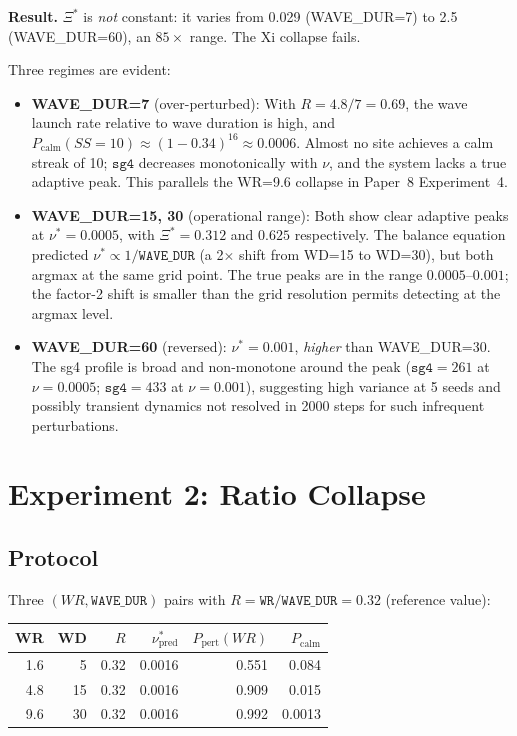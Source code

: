 \documentclass[11pt]{article}
\theoremstyle{remark}
\begin{document}
\textbf{Result.} $\Xi^*$ is \emph{not} constant: it varies from 0.029
(WAVE\_DUR=7) to 2.5 (WAVE\_DUR=60), an $85\times$ range. The Xi collapse fails.

Three regimes are evident:
\begin{itemize}
  \item \textbf{WAVE\_DUR=7} (over-perturbed): With $R = 4.8/7 = 0.69$, the wave
    launch rate relative to wave duration is high, and $P_{\text{calm}}(SS=10)
    \approx (1-0.34)^{16} \approx 0.0006$. Almost no site achieves a calm streak
    of 10; $\mathtt{sg4}$ decreases monotonically with $\nu$, and the system
    lacks a true adaptive peak. This parallels the WR=9.6 collapse in Paper~8
    Experiment~4.

  \item \textbf{WAVE\_DUR=15, 30} (operational range): Both show clear adaptive
    peaks at $\nu^* = 0.0005$, with $\Xi^* = 0.312$ and $0.625$ respectively.
    The balance equation predicted $\nu^* \propto 1/\mathtt{WAVE\_DUR}$ (a 2$\times$
    shift from WD=15 to WD=30), but both argmax at the same grid point. The true
    peaks are in the range $0.0005$--$0.001$; the factor-2 shift is smaller than
    the grid resolution permits detecting at the argmax level.

  \item \textbf{WAVE\_DUR=60} (reversed): $\nu^* = 0.001$, \emph{higher} than
    WAVE\_DUR=30. The sg4 profile is broad and non-monotone around the peak
    ($\mathtt{sg4} = 261$ at $\nu = 0.0005$; $\mathtt{sg4} = 433$ at $\nu =
    0.001$), suggesting high variance at 5 seeds and possibly transient dynamics
    not resolved in 2000 steps for such infrequent perturbations.
\end{itemize}

\section{Experiment 2: Ratio Collapse}
\label{sec:exp2}

\subsection{Protocol}

Three $(WR, \mathtt{WAVE\_DUR})$ pairs with $R = \mathtt{WR}/\mathtt{WAVE\_DUR}
= 0.32$ (reference value):

\begin{center}
\begin{tabular}{rrrrrr}
\toprule
WR & WD & $R$ & $\nu^*_{\text{pred}}$ & $P_{\text{pert}}(WR)$ & $P_{\text{calm}}$ \\
\midrule
1.6 &  5 & 0.32 & 0.0016 & 0.551 & 0.084 \\
4.8 & 15 & 0.32 & 0.0016 & 0.909 & 0.015 \\
9.6 & 30 & 0.32 & 0.0016 & 0.992 & 0.0013 \\
\bottomrule
\end{tabular}
\end{center}
\end{document}
